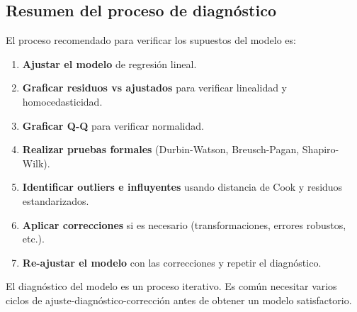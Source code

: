 \subsection{Resumen del proceso de diagnóstico}

El proceso recomendado para verificar los supuestos del modelo es:

\begin{enumerate}
	\item \textbf{Ajustar el modelo} de regresión lineal.
	\item \textbf{Graficar residuos vs ajustados} para verificar linealidad y homocedasticidad.
	\item \textbf{Graficar Q-Q} para verificar normalidad.
	\item \textbf{Realizar pruebas formales} (Durbin-Watson, Breusch-Pagan, Shapiro-Wilk).
	\item \textbf{Identificar outliers e influyentes} usando distancia de Cook y residuos estandarizados.
	\item \textbf{Aplicar correcciones} si es necesario (transformaciones, errores robustos, etc.).
	\item \textbf{Re-ajustar el modelo} con las correcciones y repetir el diagnóstico.
\end{enumerate}

\begin{observacion}
	El diagnóstico del modelo es un proceso iterativo. Es común necesitar varios ciclos de ajuste-diagnóstico-corrección antes de obtener un modelo satisfactorio.
\end{observacion}
